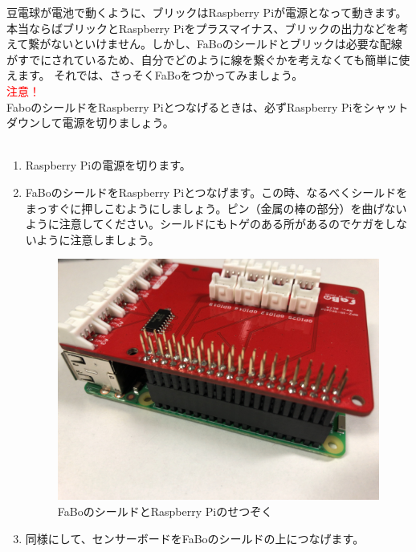 豆電球が電池で動くように、ブリックはRaspberry Piが電源となって動きます。本当ならばブリックとRaspberry Piをプラスマイナス、ブリックの出力などを考えて繋がないといけません。しかし、FaBoのシールドとブリックは必要な配線がすでにされているため、自分でどのように線を繋ぐかを考えなくても簡単に使えます。
それでは、さっそくFaBoをつかってみましょう。\\

{\Large\textcolor{red}{注意！}}\\
FaboのシールドをRaspberry Piとつなげるときは、必ずRaspberry Piをシャットダウンして電源を切りましょう。\\
\\
\begin{enumerate}
\item Raspberry Piの電源を切ります。\\
\item FaBoのシールドをRaspberry Piとつなげます。この時、なるべくシールドをまっすぐに押しこむようにしましょう。ピン（金属の棒の部分）を曲げないように注意してください。シールドにもトゲのある所があるのでケガをしないように注意しましょう。\\
\begin{figure}[H]
 \centering
 \includegraphics[width=\hsize/2]{images/chap05/text05-img006.jpg}
 \caption{FaBoのシールドとRaspberry Piのせつぞく}
\end{figure}
\item 同様にして、センサーボードをFaBoのシールドの上につなげます。\\
\begin{figure}[H]
 \centering

\end{figure}
\end{enumerate}
